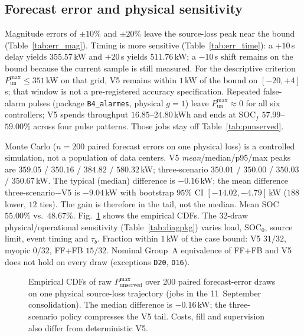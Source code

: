 \documentclass{ieeeaccess}
\begin{document}
\subsection{Forecast error and physical sensitivity}
Magnitude errors of $\pm 10\%$ and $\pm 20\%$ leave the source-loss peak near the bound (Table~\ref{tab:err_mag}). Timing is more sensitive (Table~\ref{tab:err_time}): a $+10$\,s delay yields $355.57$\,kW and $+20$\,s yields $511.76$\,kW; a $-10$\,s shift remains on the bound because the current sample is still measured. For the descriptive criterion $P_{\mathrm{un}}^{\max}\le 351$\,kW on that grid, V5 remains within $1$\,kW of the bound on $[-20,+4]$\,s; that window is not a pre-registered accuracy specification. Repeated false-alarm pulses (package \texttt{B4\_alarmes}, physical $g{=}1$) leave $P_{\mathrm{un}}^{\max}\approx 0$ for all six controllers; V5 spends throughput $16.85$--$24.80$\,kWh and ends at SOC$_f$ $57.99$--$59.00\%$ across four pulse patterns. Those jobs stay off Table~\ref{tab:punserved}.

Monte Carlo ($n{=}200$ paired forecast errors on one physical loss) is a controlled simulation, not a population of data centers. V5 \emph{mean}/median/p95/max peaks are $359.05$ / $350.16$ / $384.82$ / $580.32$\,kW; three-scenario $350.01$ / $350.00$ / $350.03$ / $350.67$\,kW. The typical (median) difference is $-0.16$\,kW; the mean difference three-scenario$-$V5 is $-9.04$\,kW with bootstrap $95\%$ CI $[-14.02,-4.79]$\,kW ($188$ lower, $12$ ties). The gain is therefore in the tail, not the median. Mean SOC $55.00\%$ vs.\ $48.67\%$. Fig.~\ref{fig:mc_ecdf} shows the empirical CDFs. The 32-draw physical/operational sensitivity (Table~\ref{tab:diagpkg}) varies load, $\mathrm{SOC}_0$, source limit, event timing and $\tau_b$. Fraction within $1$\,kW of the case bound: V5 $31/32$, myopic $0/32$, FF+FB $15/32$. Nominal Group~A equivalence of FF+FB and V5 does not hold on every draw (exceptions \texttt{D20}, \texttt{D16}).

\begin{figure}[!t]
\centering
{}
\caption{Empirical CDFs of raw $P_{\mathrm{unserved}}^{\max}$ over 200 paired forecast-error draws on one physical source-loss trajectory (jobs in the 11~September consolidation). The median difference is $-0.16$\,kW; the three-scenario policy compresses the V5 tail. Costs, fill and supervision also differ from deterministic V5.}
\label{fig:mc_ecdf}
\end{figure}
\end{document}
